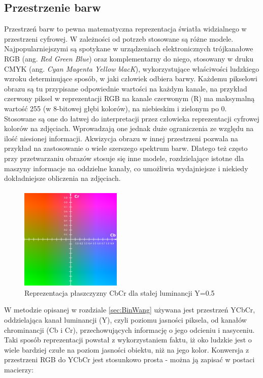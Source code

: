 \subsection{Przestrzenie barw}
\label{sec:colorSpace}
Przestrzeń barw to pewna matematyczna reprezentacja światła widzialnego w przestrzeni cyfrowej. W zależności od potrzeb stosowane są różne modele. Najpopularniejszymi są spotykane w urządzeniach elektronicznych trójkanałowe RGB (ang. \textit{Red Green Blue}) oraz komplementarny do niego, stosowany w druku CMYK (ang. \textit{Cyan Magenta Yellow blacK}), wykorzystujące właściwości ludzkiego wzroku determinujące sposób, w jaki człowiek odbiera barwy. Każdemu pikselowi obrazu są tu przypisane odpowiednie wartości na każdym kanale, na przykład czerwony piksel w reprezentacji RGB na kanale czerwonym (R) ma maksymalną wartość 255 (w 8-bitowej głębi kolorów), na niebieskim i zielonym po 0. Stosowane są one do łatwej do interpretacji przez człowieka reprezentacji cyfrowej kolorów na zdjęciach. Wprowadzają one jednak duże ograniczenia ze względu na ilość niesionej informacji. Akwizycja obrazu w innej przestrzeni pozwala na przykład na zastosowanie o wiele szerszego spektrum barw. Dlatego też często przy przetwarzaniu obrazów stosuje się inne modele, rozdzielające istotne dla maszyny informacje na oddzielne kanały, co umożliwia wydajniejsze i niekiedy dokładniejsze obliczenia na zdjęciach.
\paragraph{}
\begin{figure}[!htb]
\centering
\includegraphics[width=182px]{img/YCbCr}
\caption{Reprezentacja płaszczyzny 
CbCr dla stałej luminancji Y=0.5}
\end{figure}
W metodzie opisanej w rozdziale \ref{sec:BinWang}  używana jest przestrzeń YCbCr, oddzielająca kanał luminancji (Y), czyli poziomu jasności piksela, od kanałów chrominancji (Cb i Cr), przechowujących informację o jego odcieniu i nasyceniu. Taki sposób reprezentacji powstał z wykorzystaniem faktu, iż oko ludzkie jest o wiele bardziej czułe na poziom jasności obiektu, niż na jego kolor. Konwersja z przestrzeni RGB do YCbCr jest stosunkowo prosta - można ją zapisać w postaci macierzy:

